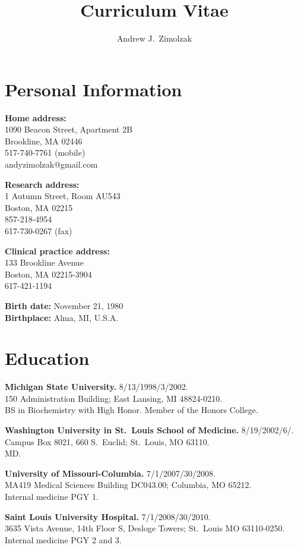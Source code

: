 \documentclass[12pt]{article}
\title{Curriculum Vitae}
\author{Andrew J.\ Zimolzak}
\begin{document}
\thispagestyle{fancy}

\section*{Personal Information}

\textbf{Home address:}\\
1090 Beacon Street, Apartment 2B\\
Brookline, MA 02446\\
517-740-7761 (mobile)\\
andyzimolzak@gmail.com

\textbf{Research address:}\\
1 Autumn Street, Room AU543\\
Boston, MA 02215\\
857-218-4954\\
617-730-0267 (fax)

\textbf{Clinical practice address:}\\
133 Brookline Avenue\\
Boston, MA 02215-3904\\
617-421-1194

\textbf{Birth date:} November 21, 1980\\
\textbf{Birthplace:} Alma, MI, U.S.A.

\section*{Education}

\textbf{Michigan State University.} 8/13/1998/3/2002.\\
150 Administration Building; East Lansing, MI 48824-0210.\\
BS in Biochemistry with High Honor. Member of the Honors College.

\textbf{Washington University in St.\ Louis School of Medicine.}
8/19/2002\ndash{}/6/.\\
Campus Box 8021, 660 S.\ Euclid; St.\ Louis, MO 63110.\\
MD.

\textbf{University of Missouri-Columbia.} 7/1/2007/30/2008.\\
MA419 Medical Sciences Building DC043.00; Columbia, MO 65212.\\
Internal medicine PGY 1.

\textbf{Saint Louis University Hospital.} 7/1/2008/30/2010.\\
3635 Vista Avenue, 14th Floor S, Desloge Towers; St.\ Louis MO
63110-0250.\\
Internal medicine PGY 2 and 3.
\end{document}
